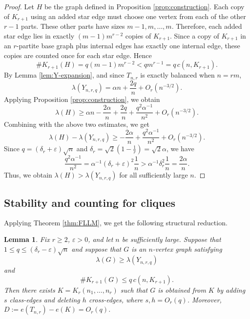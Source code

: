 \documentclass[11pt,a4paper]{article}
\newtheorem{lemma}[theorem]{Lemma}
\theoremstyle{definition}
\theoremstyle{plain}
\renewcommand{\le}{\leqslant}
\renewcommand{\ge}{\geqslant}
\begin{document}
\begin{proof}
Let $H$ be the graph defined in  Proposition \ref{prop:construction}. 
Each copy of $K_{r+1}$ using an added star edge must choose one vertex from each of the other
$r-1$ parts. These other parts have sizes
$m-1,m,\ldots,m$. 
Therefore, each added star edge lies in exactly $ (m-1)m^{r-2}$ 
copies of $K_{r+1}$. Since a copy of $K_{r+1}$ in an $r$-partite base graph plus internal edges
has exactly one internal edge, these copies are counted once for each star edge. Hence 
\[
     \texttt{\#} K_{r+1}(H)=  q(m-1)m^{r-2}<qm^{r-1}=q\,c(n,K_{r+1}).
\]
By Lemma \ref{lem:Y-expansion}, and since $T_{n,r}$ is exactly balanced when
$n=rm$,
\begin{equation*}
        \lambda(Y_{n,r,q})
        =\alpha n+\frac{2q}{n}+O_r(n^{-3/2}).
\end{equation*}
Applying Proposition \ref{prop:construction}, we obtain
   \[   \lambda(H)
        \ge \alpha n-\frac{2\alpha}{n}+\frac{2q}{n}
              +\frac{q^2\alpha^{-1}}{n^2}+O_r(n^{-3/2}).  \]
    Combining with the above two estimates, we get 
\begin{equation*}
        \lambda(H)-\lambda(Y_{n,r,q})
        \ge -\frac{2\alpha}{n}+\frac{q^2\alpha^{-1}}{n^2}+O_r(n^{-3/2}).
\end{equation*} 
Since $  q =(\delta_r+\varepsilon)\sqrt n$ and $\delta_r=\sqrt{2} (1- \frac{1}{r}) =\sqrt{2} \alpha$, we have 
\[
        \frac{q^2\alpha^{-1}}{n^2}
        = \alpha^{-1}(\delta_r+\varepsilon)^2\frac1n
        > \alpha^{-1} \delta_r^2\frac1n
        =\frac{2\alpha}{n}.
\]
Thus, we obtain $ \lambda(H)>\lambda(Y_{n,r,q})$ for all sufficiently large
$n$.  
\end{proof}



\subsection{Stability and counting for cliques}


Applying Theorem \ref{thm:FLLM}, 
we get the following structural reduction.

\begin{lemma} 
\label{lem:reduction}
Fix $r\ge 2$, $\varepsilon>0$, and let $n$ be sufficiently large. Suppose that
$  1\le q\le (\delta_r -\varepsilon)\sqrt n$ 
and suppose that $G$ is an $n$-vertex graph satisfying
$$  \lambda(G)\ge \lambda(Y_{n,r,q}) $$
and
$$   \texttt{\#} K_{r+1}(G) \le q\,c(n,K_{r+1}). $$
Then there exists 
$  K=K_r(n_1,\ldots,n_r)$ 
such that $G$ is obtained from $K$ by adding $s$ class-edges and deleting $h$ cross-edges, 
where $s,h=O_r(q)$. Moreover, 
$ D:=e(T_{n,r})-e(K) =O_r(q)$. 
\end{lemma}
\end{document}
